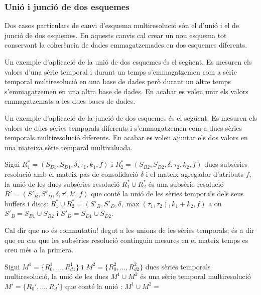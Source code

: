\subsubsection{Unió i junció de dos esquemes}

Dos casos particulars de canvi d'esquema multiresolució són el d'unió
i el de junció de dos esquemes. En aquests canvis cal crear un nou
esquema tot conservant la coherència de dades emmagatzemades en dos
esquemes diferents.

Un exemple d'aplicació de la unió de dos esquemes és el següent. Es
mesuren els valors d'una sèrie temporal i durant un temps
s'emmagatzemen com a sèrie temporal multiresolució en una base de
dades però durant un altre temps s'emmagatzemen en una altra base de
dades. En acabar es volen unir els valors emmagatzemats a les dues
bases de dades.

Un exemple d'aplicació de la junció de dos esquemes és el següent.  Es
mesuren els valors de dues sèries temporals diferents i s'emmagatzemen
com a dues sèries temporals multiresolució diferents. En acabar es
volen ajuntar els dos valors en una mateixa sèrie temporal
multivaluada.






\todo{}

\begin{definition}
  Sigui $R_1^*=(S_{B1},S_{D1},\delta,\tau_1,k_1,f)$ i
  $R_2^*=(S_{B2},S_{D2},\delta,\tau_2,k_2,f)$ dues subsèries resolució
  amb el mateix pas de consolidació $\delta$ i el mateix agregador
  d'atributs $f$, la unió de les dues subsèries resolució $R_1^* \cup
  R_2^*$ és una subsèrie resolució $R' =
  (S'_B,S'_D,\delta,\tau',k',f)$ que conté la unió de les sèries
  temporals dels seus buffers i discs: $R_1^* \cup R_2^* =
  (S'_B,S'_D,\delta,\max(\tau_1,\tau_2),k_1+k_2,f)$ a on $S'_B =
  S_{B1} \cup S_{B2}$ i $S'_D = S_{D1} \cup S_{D2}$.
\end{definition}

Cal dir que no és commutatiu! degut a les unions de les sèries temporals; és a dir que en cas que les subsèries resolució continguin mesures en el mateix temps es creu més a la primera.


\todo{}
\begin{definition}
  Sigui $M^1=\{R_0^1,\dotsc,R_{d1}^1\}$ i $M^2=\{R_0^2,\dotsc,R_{d2}^2\}$
  dues sèries temporals multiresolució, la unió de les dues $M^1 \cup
  M^2$ és una sèrie temporal multiresolució
  $M'=\{R_0',\dotsc,R_d'\}$ que conté la unió : $M^1 \cup
  M^2=$ 
 
\end{definition}

